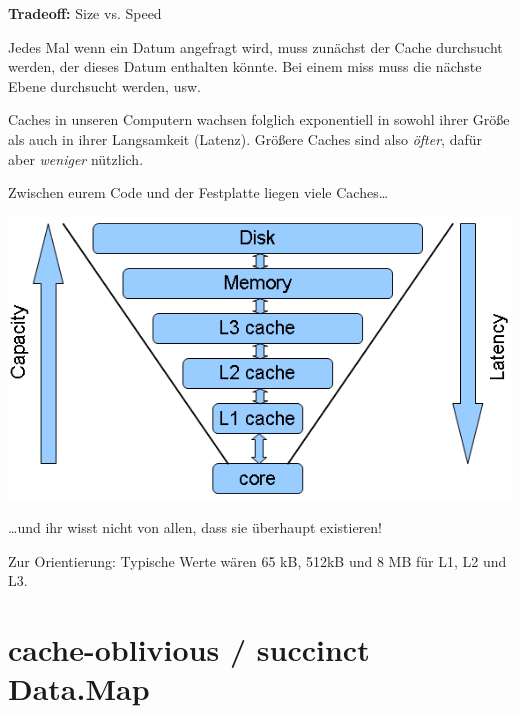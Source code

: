 \documentclass{beamer}
\begin{document}

\begin{frame}

\textbf{Tradeoff:} Size vs. Speed
\bigskip

Jedes Mal wenn ein Datum angefragt wird, muss zunächst der Cache durchsucht werden, der dieses Datum enthalten könnte. Bei einem miss muss die nächste Ebene durchsucht werden, usw.
\pause
\bigskip

Caches in unseren Computern wachsen folglich exponentiell in sowohl ihrer Größe als auch in ihrer Langsamkeit (Latenz). Größere Caches sind also \emph{öfter}, dafür aber \emph{weniger} nützlich.

\end{frame}


\begin{frame}

Zwischen eurem Code und der Festplatte liegen viele Caches\dots

\begin{center}
\includegraphics[scale=0.35]{cpu_cache_structure.png} 
\end{center}
\pause

\dots und ihr wisst nicht von allen, dass sie überhaupt existieren!\pause

Zur Orientierung: Typische Werte wären 65 kB, 512kB und 8 MB für L1, L2 und L3. 

\end{frame}

\section{cache-oblivious / succinct Data.Map}
\end{document}
